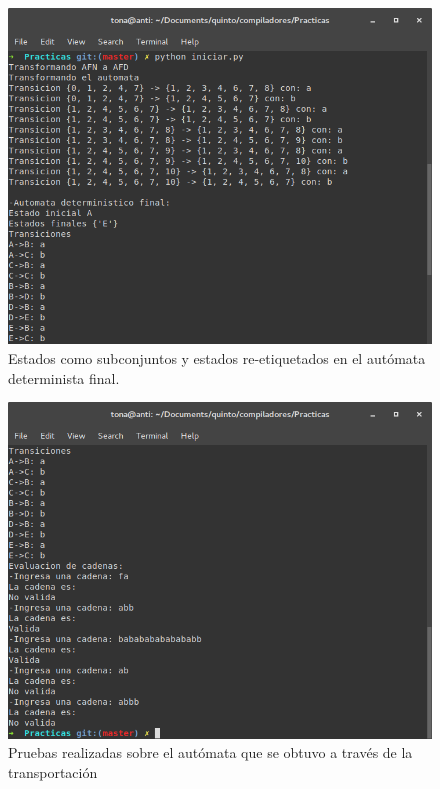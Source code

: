 \documentclass[titlepage]{article}
\begin{document}
    \begin{figure}[H]
        \begin{center}
        \includegraphics[width=\textwidth]{1.png}
        \caption{Estados como subconjuntos y estados re-etiquetados en el autómata determinista final.}
        \label{fig:creacion}
        \end{center}
    \end{figure}
    \begin{figure}[H]
        \begin{center}
        \includegraphics[width=\textwidth]{2.png}
        \caption{Pruebas realizadas sobre el autómata que se obtuvo a través de la transportación}
        \label{fig:pruebas}
        \end{center}
    \end{figure}
\end{document}
